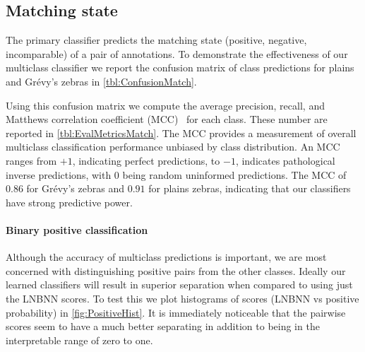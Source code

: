     \subsection{Matching state}

        The primary classifier predicts the matching state (positive, negative, incomparable) of a pair of
        annotations. To demonstrate the effectiveness of our multiclass classifier we report the confusion matrix
        of class predictions for plains and Grévy's zebras in \cref{tbl:ConfusionMatch}.

        \ConfusionMatch{}

        \EvalMetricsMatch{}

        Using this confusion matrix we compute the average precision, recall, and Matthews correlation
          coefficient (MCC)~\cite{powers_evaluation_2011} for each class.
        These number are reported in \cref{tbl:EvalMetricsMatch}.
        The MCC provides a measurement of overall multiclass classification performance unbiased by class
          distribution.
        An MCC ranges from $+1$, indicating perfect predictions, to $-1$, indicates pathological inverse
          predictions, with $0$ being random uninformed predictions.
        The MCC of $0.86$ for Grévy's zebras and $0.91$ for plains zebras, indicating that our classifiers have
          strong predictive power.
        

        \paragraph{Binary positive classification}
        Although the accuracy of multiclass predictions is important, we are most concerned with distinguishing
          positive pairs from the other classes.
        Ideally our learned classifiers will result in superior separation when compared to using just the LNBNN
          scores.
        To test this we plot histograms of scores (LNBNN vs positive probability) in \cref{fig:PositiveHist}.
        It is immediately noticeable that the pairwise scores seem to have a much better separating in addition
          to being in the interpretable range of zero to one.


        \PositiveHist{}


